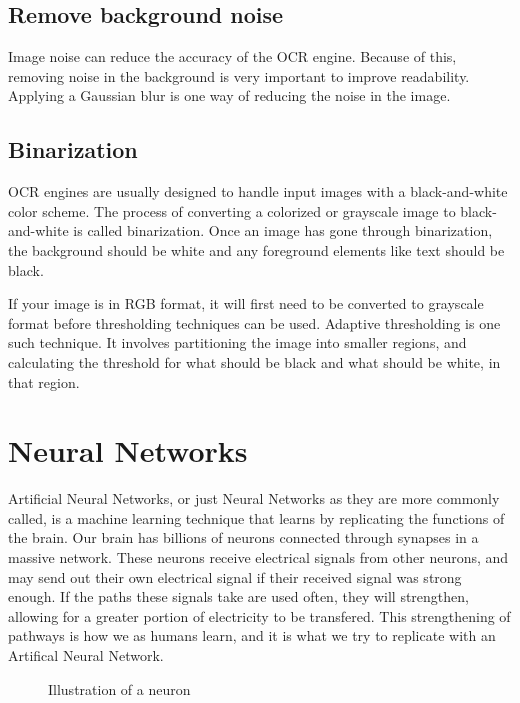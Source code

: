 \subsection{Remove background noise}\label{subsec:remove-background-noise}
Image noise can reduce the accuracy of the OCR engine.
Because of this, removing noise in the background is very important to improve readability.
Applying a Gaussian blur is one way of reducing the noise in the image.

\subsection{Binarization}\label{subsec:how-to-create-contrast}
OCR engines are usually designed to handle input images with a black-and-white color scheme.
The process of converting a colorized or grayscale image to black-and-white is called binarization.
Once an image has gone through binarization, the background should be white and any foreground elements like text should be black.

If your image is in RGB format, it will first need to be converted to grayscale format before thresholding techniques can be used.
Adaptive thresholding is one such technique.
It involves partitioning the image into smaller regions, and calculating the threshold for what should be black and what should be white, in that region.

\section{Neural Networks}\label{sec:neural networks}
Artificial Neural Networks, or just Neural Networks as they are more commonly called, is a machine learning technique that learns by replicating the functions of the brain.
Our brain has billions of neurons connected through synapses in a massive network.
These neurons receive electrical signals from other neurons, and may send out their own electrical signal if their received signal was strong enough.
If the paths these signals take are used often, they will strengthen, allowing for a greater portion of electricity to be transfered.
This strengthening of pathways is how we as humans learn, and it is what we try to replicate with an Artifical Neural Network.
\begin{figure}[h]
    \caption{Illustration of a neuron~\cite{Neuron}}
    \label{fig:figure2.3}
\end{figure}

